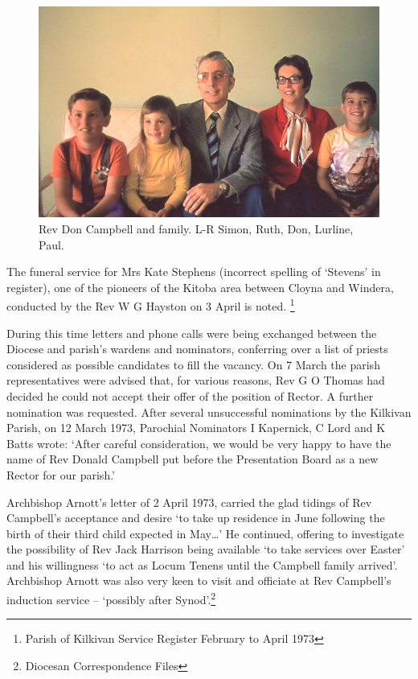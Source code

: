\begin{figure}
\begin{center}
\includegraphics[width=1.\linewidth,center]{../images/DonCampbellAndFamily.png}
\caption{Rev Don Campbell and family. L-R Simon, Ruth, Don, Lurline, Paul.}
\end{center}
\end{figure}




The funeral service for Mrs Kate Stephens (incorrect spelling of `Stevens' in register), one of the pioneers of the Kitoba area between Cloyna and Windera, conducted by the Rev W G Hayston on 3 April is noted. \footnote{Parish of Kilkivan Service Register February to April 1973}


During this time letters and phone calls were being exchanged between the Diocese and parish's wardens and nominators, conferring over a list of priests considered as possible candidates to fill the vacancy. On 7 March the parish representatives were advised that, for various reasons, Rev G O Thomas had decided he could not accept their offer of the position of Rector. A further nomination was requested. After several unsuccessful nominations by the Kilkivan Parish, on 12 March 1973, Parochial Nominators I Kapernick, C Lord and K Batts wrote: `After careful consideration, we would be very happy to have the name of Rev Donald Campbell put before the Presentation Board as a new Rector for our parish.'



Archbishop Arnott's letter of 2 April 1973, carried the glad tidings of Rev Campbell's acceptance and desire `to take up residence in June following the birth of their third child expected in May\ldots' He continued, offering to investigate the possibility of Rev Jack Harrison being available `to take services over Easter' and his willingness `to act as Locum Tenens until the Campbell family arrived'. Archbishop Arnott was also very keen to visit and officiate at Rev Campbell's induction service -- `possibly after Synod'.\footnote{Diocesan Correspondence Files}


